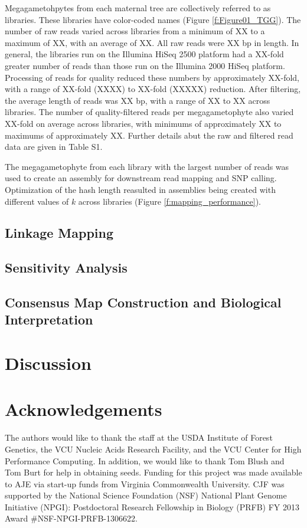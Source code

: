 \documentclass[11pt]{article}
\begin{document}
Megagametohpytes from each maternal tree are 
collectively referred to as libraries. These libraries have color-coded names (Figure \ref{f:Figure01_TGG}).
The number of raw reads varied across libraries from a minimum of
XX to a maximum of XX, with an average of XX. All raw reads were XX bp in length. In 
general, the libraries run on the Illumina HiSeq 2500 platform had a XX-fold greater 
number of reads than those run on the 
Illumina 2000 HiSeq platform. Processing of reads for quality reduced these numbers by 
approximately XX-fold, with a range 
of XX-fold (XXXX) to XX-fold (XXXXX) reduction. After filtering, the average
length of reads was XX bp, with a range of XX to XX across libraries. The number of quality-filtered reads per megagametophyte also varied XX-fold on average 
across libraries, with minimums of approximately XX to maximums of approximately XX. Further details abut the raw and filtered read data are given in Table S1.

The megagametophyte from each library with the largest number of reads
was used to create an assembly for downstream read mapping and SNP calling.
Optimization of the hash length reasulted in assemblies being created with different values of 
$k$ across libraries (Figure \ref{f:mapping_performance}).


\subsection*{Linkage Mapping}

\subsection*{Sensitivity Analysis}

\subsection*{Consensus Map Construction and Biological Interpretation}


\section*{Discussion}

\section*{Acknowledgements}

The authors would like to thank the staff at the USDA Institute of Forest Genetics, the 
VCU Nucleic Acids Research Facility, and the VCU Center for High Performance Computing. 
In addition, we would like to thank Tom Blush and Tom Burt for help in obtaining 
seeds. Funding for this project was made available to AJE via start-up funds from Virginia 
Commonwealth University. CJF was supported by the National Science Foundation (NSF) National Plant Genome 
Initiative (NPGI): Postdoctoral Research Fellowship in Biology (PRFB) FY 2013 Award \#NSF-NPGI-PRFB-1306622.
\end{document}
